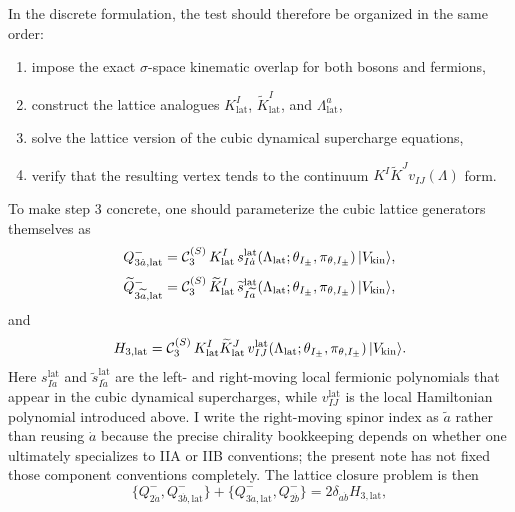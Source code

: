 \documentclass[11pt]{article}
\numberwithin{equation}{section}
\begin{document}
In the discrete formulation, the test should therefore be organized in the same order:
\begin{enumerate}
\item impose the exact $\sigma$-space kinematic overlap for both bosons and fermions,
\item construct the lattice analogues $K^I_{\mathrm{lat}}$, $\widetilde K^I_{\mathrm{lat}}$, and $\Lambda^a_{\mathrm{lat}}$,
\item solve the lattice version of the cubic dynamical supercharge equations,
\item verify that the resulting vertex tends to the continuum $K^I\widetilde K^J v_{IJ}(\Lambda)$ form.
\end{enumerate}
To make step 3 concrete, one should parameterize the cubic lattice generators themselves as
\begin{equation}
\label{eq:s15-004}
Q^-_{3\dot a,\mathrm{lat}}
=
{\cal C}_3^{(S)}\,
K^I_{\mathrm{lat}}\,
s^{\mathrm{lat}}_{I\dot a}(\Lambda_{\mathrm{lat}};\theta_{I_\pm},\pi_{\theta,I_\pm})\,
|V_{\mathrm{kin}}\rangle,
\end{equation}
\begin{equation}
\label{eq:s15-005}
\widetilde Q^-_{3\widetilde a,\mathrm{lat}}
=
{\cal C}_3^{(S)}\,
\widetilde K^I_{\mathrm{lat}}\,
\widetilde s^{\mathrm{lat}}_{I\widetilde a}(\Lambda_{\mathrm{lat}};\theta_{I_\pm},\pi_{\theta,I_\pm})\,
|V_{\mathrm{kin}}\rangle,
\end{equation}
and
\begin{equation}
\label{eq:s15-006}
H_{3,\mathrm{lat}}
=
{\cal C}_3^{(S)}\,
K^I_{\mathrm{lat}}\widetilde K^J_{\mathrm{lat}}\,
v^{\mathrm{lat}}_{IJ}(\Lambda_{\mathrm{lat}};\theta_{I_\pm},\pi_{\theta,I_\pm})\,
|V_{\mathrm{kin}}\rangle.
\end{equation}
Here $s^{\mathrm{lat}}_{I\dot a}$ and $\widetilde s^{\mathrm{lat}}_{I\widetilde a}$ are the left- and right-moving local fermionic polynomials that appear in the cubic dynamical supercharges, while $v^{\mathrm{lat}}_{IJ}$ is the local Hamiltonian polynomial introduced above. I write the right-moving spinor index as $\widetilde a$ rather than reusing $\dot a$ because the precise chirality bookkeeping depends on whether one ultimately specializes to IIA or IIB conventions; the present note has not fixed those component conventions completely. The lattice closure problem is then
\begin{equation}
\label{eq:s15-007}
\{Q^-_{2\dot a},Q^-_{3\dot b,\mathrm{lat}}\}
+\{Q^-_{3\dot a,\mathrm{lat}},Q^-_{2\dot b}\}
=
2\delta_{\dot a\dot b}H_{3,\mathrm{lat}},
\end{equation}
\end{document}
